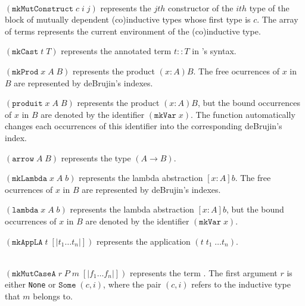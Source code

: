\begin{description}
 {\\ $(\texttt{mkMutConstruct}\;c\;i\;j)$ represents the
    $jth$ constructor of the $ith$ type of the block of mutually
    dependent (co)inductive types whose first type is $c$. The array
    of terms represents the current environment of the (co)inductive
    type.}

    {$(\texttt{mkCast}\;t\;T)$ represents the annotated term $t::T$ in
    \Coq's syntax.}  

    {$(\texttt{mkProd}\;x\;A\;B)$ represents the product $(x:A)B$.
     The free ocurrences of $x$ in $B$ are represented by deBrujin's
     indexes.}

    {$(\texttt{produit}\;x\;A\;B)$ represents the product $(x:A)B$,
     but the bound occurrences of $x$ in $B$ are denoted by 
     the identifier $(\texttt{mkVar}\;x)$. The function automatically 
     changes each occurrences of this identifier into the corresponding 
     deBrujin's index.}

    {$(\texttt{arrow}\;A\;B)$ represents the type $(A\rightarrow B)$.}

    {$(\texttt{mkLambda}\;x\;A\;b)$ represents the lambda abstraction 
     $[x:A]b$. The free ocurrences of $x$ in $B$ are represented by deBrujin's
     indexes.}

    {$(\texttt{lambda}\;x\;A\;b)$ represents the lambda abstraction 
     $[x:A]b$, but the bound occurrences of $x$ in $B$ are denoted by 
     the identifier $(\texttt{mkVar}\;x)$. }

    {$(\texttt{mkAppLA}\;t\;[|t_1\ldots t_n|])$ represents the application
    $(t\;t_1\;\ldots t_n)$.}

    {\\ $(\texttt{mkMutCaseA}\;r\;P\;m\;[|f_1\ldots f_n|])$
    represents the term . The first argument
    $r$ is either \texttt{None} or $\texttt{Some}\;(c,i)$, where the
    pair $(c,i)$ refers to the inductive type that $m$ belongs to.}


\end{description}
